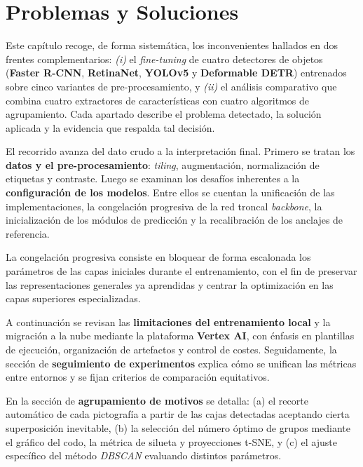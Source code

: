 \chapter{Problemas y Soluciones}\label{ch:problemas_y_soluciones}
\noindent
Este capítulo recoge, de forma sistemática, los inconvenientes hallados en dos frentes complementarios:
\emph{(i)} el \emph{fine-tuning} de cuatro detectores de objetos (\textbf{Faster R-CNN}, \textbf{RetinaNet}, \textbf{YOLOv5} y \textbf{Deformable DETR}) entrenados sobre cinco variantes de pre-procesamiento, y
\emph{(ii)} el análisis comparativo que combina cuatro extractores de características con cuatro algoritmos de agrupamiento.
Cada apartado describe el problema detectado, la solución aplicada y la evidencia que respalda tal decisión.

El recorrido avanza del dato crudo a la interpretación final.
Primero se tratan los \textbf{datos y el pre-procesamiento}: \emph{tiling}, augmentación, normalización de etiquetas y contraste.
Luego se examinan los desafíos inherentes a la \textbf{configuración de los modelos}.
Entre ellos se cuentan la unificación de las implementaciones, la congelación progresiva de la red troncal \emph{backbone}, la inicialización de los módulos de predicción y la recalibración de los anclajes de referencia.

La congelación progresiva consiste en bloquear de forma escalonada los parámetros de las capas iniciales durante el entrenamiento, con el fin de preservar las representaciones generales ya aprendidas y centrar la optimización en las capas superiores especializadas.

A continuación se revisan las \textbf{limitaciones del entrenamiento local} y la migración a la nube mediante la plataforma \textbf{Vertex AI}, con énfasis en plantillas de ejecución, organización de artefactos y control de costes.
Seguidamente, la sección de \textbf{seguimiento de experimentos} explica cómo se unifican las métricas entre entornos y se fijan criterios de comparación equitativos.

En la sección de \textbf{agrupamiento de motivos} se detalla:
(a) el recorte automático de cada pictografía a partir de las cajas detectadas aceptando cierta superposición inevitable,
(b) la selección del número óptimo de grupos mediante el gráfico del codo, la métrica de silueta y proyecciones t-SNE,
y (c) el ajuste específico del método \textit{DBSCAN} evaluando distintos parámetros.

